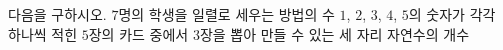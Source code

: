 다음을 구하시오.
 $7$명의 학생을 일렬로 세우는 방법의 수
 $1$, $2$, $3$, $4$, $5$의 숫자가 각각 하나씩 적힌 $5$장의 카드 중에서 $3$장을 뽑아 만들 수 있는 세 자리 자연수의 개수
